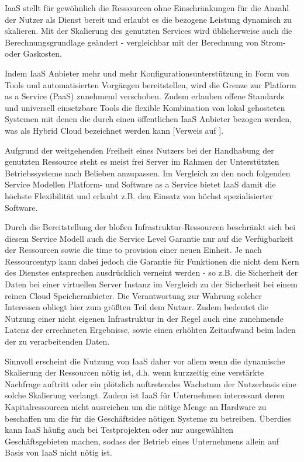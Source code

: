 IaaS stellt für gewöhnlich die Ressourcen ohne Einschränkungen für die Anzahl der Nutzer als Dienst bereit und erlaubt es die bezogene Leistung dynamisch zu skalieren. Mit der Skalierung des genutzten Services wird üblicherweise auch die Berechnungsgrundlage geändert - vergleichbar mit der Berechnung von Strom- oder Gaskosten.

Indem IaaS Anbieter mehr und mehr Konfigurationsunterstützung in Form von Tools und automatisierten Vorgängen bereitstellen, wird die Grenze zur Platform as a Service (PaaS) zunehmend verschoben. Zudem erlauben offene Standards und universell einsetzbare Tools die flexible Kombination von lokal gehosteten Systemen mit denen die durch einen öffentlichen IaaS Anbieter bezogen werden, was als Hybrid Cloud bezeichnet werden kann [Verweis auf ].

Aufgrund der weitgehenden Freiheit eines Nutzers bei der Handhabung der genutzten Ressource steht es meist frei Server im Rahmen der Unterstützten Betriebssysteme nach Belieben anzupassen. Im Vergleich zu den noch folgenden Service Modellen Platform- und Software as a Service bietet IaaS damit die höchste Flexibilität und erlaubt z.B. den Einsatz von höchst spezialisierter Software.

Durch die Bereitstellung der bloßen Infrastruktur-Ressourcen beschränkt sich bei diesem Service Modell auch die Service Level Garantie nur auf die Verfügbarkeit der Ressourcen sowie die time to provision einer neuen Einheit. Je nach Ressourcentyp kann dabei jedoch die Garantie für Funktionen die nicht dem Kern des Dienstes entsprechen ausdrücklich verneint werden - so z.B. die Sicherheit der Daten bei einer virtuellen Server Instanz im Vergleich zu der Sicherheit bei einem reinen Cloud Speicheranbieter. Die Verantwortung zur Wahrung solcher Interessen obliegt hier zum größten Teil dem Nutzer. Zudem bedeutet die Nutzung einer nicht eigenen Infrastruktur in der Regel auch eine zunehmende Latenz der errechneten Ergebnisse, sowie einen erhöhten Zeitaufwand beim laden der zu verarbeitenden Daten.

Sinnvoll erscheint die Nutzung von IaaS daher vor allem wenn die dynamische Skalierung der Ressourcen nötig ist, d.h. wenn kurzzeitig eine verstärkte Nachfrage auftritt oder ein plötzlich auftretendes Wachstum der Nutzerbasis eine solche Skalierung verlangt. Zudem ist IaaS für Unternehmen interessant deren Kapitalressourcen nicht ausreichen um die nötige Menge an Hardware zu beschaffen um die für die Geschäftsidee nötigen Systeme zu betreiben. Überdies kann IaaS häufig auch bei Testprojekten oder nur ausgewählten Geschäftsgebieten machen, sodass der Betrieb eines Unternehmens allein auf Basis von IaaS nicht nötig ist.

